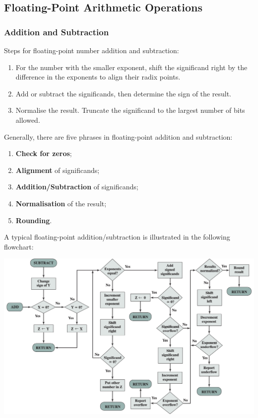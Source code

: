 \subsection{Floating-Point Arithmetic Operations}

\subsubsection{Addition and Subtraction}

Steps for floating-point number addition and subtraction:
\begin{enumerate}
    \item For the number with the smaller exponent, shift the significand right by the difference
        in the exponents to align their radix points.
    \item Add or subtract the significands, then determine the sign of the result.
    \item Normalise the result. Truncate the significand to the largest number of bits allowed.
\end{enumerate}

Generally, there are five phrases in floating-point addition and subtraction:
\begin{enumerate}
    \item \textbf{Check for zeros};
    \item \textbf{Alignment} of significands;
    \item \textbf{Addition/Subtraction} of significands;
    \item \textbf{Normalisation} of the result;
    \item \textbf{Rounding}.
\end{enumerate}

A typical floating-point addition/subtraction is illustrated in the following flowchart:

\begin{center}
    \includegraphics[scale=0.29]{chaps/number-representation/flt-add-sub-flow-chart.png}
\end{center}

